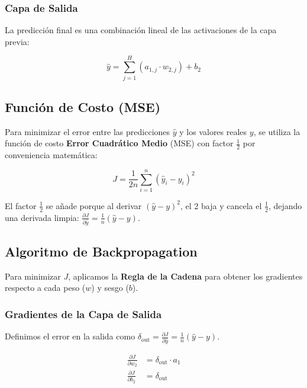 \documentclass[12pt,a4paper]{article}
\theoremstyle{definition}
\begin{document}
\subsubsection{Capa de Salida}

La predicci\'{o}n final es una combinaci\'{o}n lineal de las activaciones de la capa previa:

\begin{equation}\label{eq:capa_salida}
\hat{y} = \sum_{j=1}^{H} (a_{1,j} \cdot w_{2,j}) + b_2
\end{equation}

\subsection{Funci\'{o}n de Costo (MSE)}

Para minimizar el error entre las predicciones $\hat{y}$ y los valores reales $y$, se utiliza la funci\'{o}n de costo \textbf{Error Cuadr\'{a}tico Medio} (MSE) con factor $\frac{1}{2}$ por conveniencia matem\'{a}tica:

\begin{equation}\label{eq:mse}
J = \frac{1}{2n} \sum_{i=1}^{n} (\hat{y}_i - y_i)^2
\end{equation}

El factor $\frac{1}{2}$ se a\~{n}ade porque al derivar $(\hat{y} - y)^2$, el 2 baja y cancela el $\frac{1}{2}$, dejando una derivada limpia: $\frac{\partial J}{\partial \hat{y}} = \frac{1}{n}(\hat{y} - y)$.

\subsection{Algoritmo de Backpropagation}

Para minimizar $J$, aplicamos la \textbf{Regla de la Cadena} para obtener los gradientes respecto a cada peso ($w$) y sesgo ($b$).

\subsubsection{Gradientes de la Capa de Salida}

Definimos el error en la salida como $\delta_{\text{out}} = \frac{\partial J}{\partial \hat{y}} = \frac{1}{n}(\hat{y} - y)$.

\begin{align}
\frac{\partial J}{\partial w_2} &= \delta_{\text{out}} \cdot a_1 \label{eq:grad_w2} \\
\frac{\partial J}{\partial b_2} &= \delta_{\text{out}} \label{eq:grad_b2}
\end{align}
\end{document}
